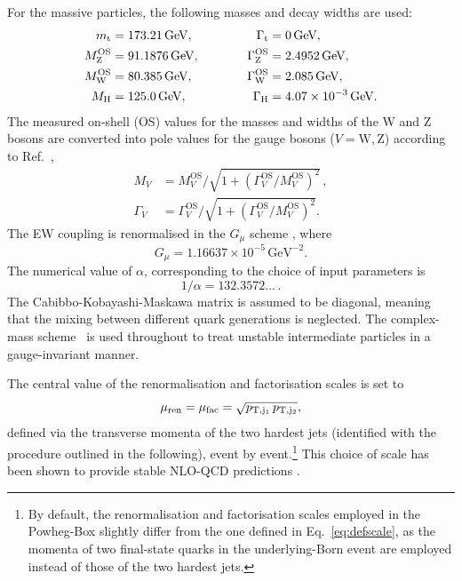 \documentclass[twocolumn,epjc3]{svjour3} %
\newcommand{\PH}{\ensuremath{\text{H}}\xspace}
\newcommand{\Pt}{\ensuremath{\text{t}}\xspace}
\newcommand{\PW}{\ensuremath{\text{W}}\xspace}
\newcommand{\PZ}{\ensuremath{\text{Z}}\xspace}
\newcommand{\Mt}{\ensuremath{m_\Pt}\xspace}
\newcommand{\MWOS}{\ensuremath{M_\PW^\text{OS}}\xspace}
\newcommand{\MZOS}{\ensuremath{M_\PZ^\text{OS}}\xspace}
\newcommand{\Gt}{\ensuremath{\Gamma_\Pt}\xspace}
\newcommand{\GH}{\ensuremath{\Gamma_\PH}\xspace}
\newcommand{\GZOS}{\ensuremath{\Gamma_\PZ^\text{OS}}\xspace}
\newcommand{\GWOS}{\ensuremath{\Gamma_\PW^\text{OS}}\xspace}
\newcommand{\GeV}{\ensuremath{\,\text{GeV}}\xspace}
\newcommand{\MVOS}{\ensuremath{M_{V}^\text{OS}}\xspace}%
\newcommand{\GVOS}{\ensuremath{\Gamma_{V}^\text{OS}}\xspace}%
\newlength{\width}
\begin{document}
    For the massive particles, the following masses and decay widths are used:
    \begin{alignat}{2}
                      \Mt   &=  173.21\GeV,       & \quad \quad \quad \Gt &= 0 \GeV,  \nonumber \\
                    \MZOS &=  91.1876\GeV,      & \quad \quad \quad \GZOS &= 2.4952\GeV,  \nonumber \\
                    \MWOS &=  80.385\GeV,       & \GWOS &= 2.085\GeV,  \nonumber \\
                    M_{\rm H} &=  125.0\GeV,       &  \GH   &=  4.07 \times 10^{-3}\GeV.
    \end{alignat}
    The measured on-shell (OS) values for the masses and widths of the W and Z bosons are converted into pole values for the gauge bosons ($V=\PW,\PZ$) according to Ref.~\cite{Bardin:1988xt},
    \begin{equation}
    \begin{split}
            M_V &= \MVOS/\sqrt{1+(\GVOS/\MVOS)^2}\,, \\
       \Gamma_V &= \GVOS/\sqrt{1+(\GVOS/\MVOS)^2}.
    \end{split}
    \end{equation}
    The EW coupling is renormalised in the $G_\mu$ scheme \cite{Denner:2000bj}, where
    \begin{equation}
        G_{\mu}    = 1.16637\times 10^{-5}\GeV^{-2}.
    \end{equation}
    The numerical value of $\alpha$, corresponding to the choice of input parameters is
    \begin{equation}
     1/\alpha = 132.3572\ldots\,.
    \end{equation}
    The Cabibbo-Kobayashi-Maskawa matrix is assumed to be diagonal, meaning that the mixing between different quark generations is neglected.
    The complex-mass scheme~\cite{Denner:1999gp,Denner:2005fg,Denner:2006ic} is used throughout to treat unstable intermediate particles in a gauge-invariant manner.

    The central value of the renormalisation and factorisation scales is set to 
    \begin{equation}
    \label{eq:defscale}
     \mu_{\rm ren} = \mu_{\rm fac} = \sqrt{p_{\rm T, j_1}\, p_{\rm T, j_2}}, 
    \end{equation}
    defined via the transverse momenta of the two hardest jets (identified with the procedure outlined in the following), 
    event by event.\footnote{By default, the renormalisation and factorisation scales employed in the {\sc Powheg-Box} slightly differ from the 
        one defined in Eq.~\eqref{eq:defscale}, as the momenta of two final-state quarks in the underlying-Born event are
        employed instead of those of the two hardest jets.\label{foot:powheg}} 
    This choice of scale has been shown to provide stable NLO-QCD predictions \cite{Denner:2012dz}.
\end{document}
